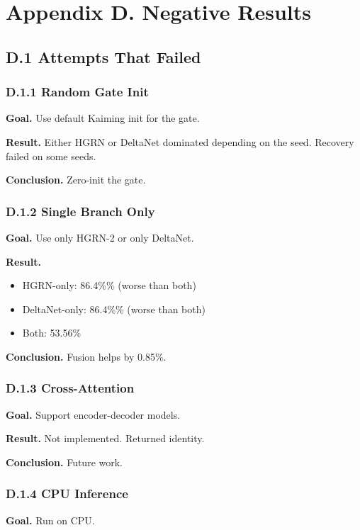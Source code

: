 \section{Appendix D. Negative Results}

\subsection{D.1 Attempts That Failed}

\subsubsection{D.1.1 Random Gate Init}

\textbf{Goal.} Use default Kaiming init for the gate.

\textbf{Result.} Either HGRN or DeltaNet dominated depending on the seed. 
Recovery failed on some seeds.

\textbf{Conclusion.} Zero-init the gate.

\subsubsection{D.1.2 Single Branch Only}

\textbf{Goal.} Use only HGRN-2 or only DeltaNet.

\textbf{Result.}
\begin{itemize}
\item HGRN-only: 86.4\%\% (worse than both)
\item DeltaNet-only: 86.4\%\% (worse than both)
\item Both: 53.56\%

\end{itemize}
\textbf{Conclusion.} Fusion helps by 0.85\%.

\subsubsection{D.1.3 Cross-Attention}

\textbf{Goal.} Support encoder-decoder models.

\textbf{Result.} Not implemented. Returned identity.

\textbf{Conclusion.} Future work.

\subsubsection{D.1.4 CPU Inference}

\textbf{Goal.} Run on CPU.


